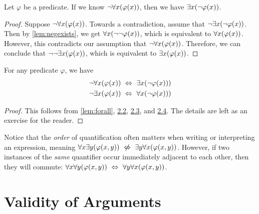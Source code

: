 \begin{lemma}\label{lem:negforall}
    Let $\varphi$ be a predicate.
    If we know $\neg \forall x \pn*{\varphi(x)}$, then we have $\exists x \pn*{\neg \varphi(x)}$.
\end{lemma}
\begin{proof}
    Suppose $\neg \forall x \pn*{\varphi(x)}$.
    Towards a contradiction, assume that $\neg \exists x \pn*{\neg \varphi(x)}$.
    Then by \autoref{lem:negexists}, we get $\forall x \pn*{\neg \neg \varphi(x)}$,
    which is equivalent to $\forall x \pn*{\varphi(x)}$.
    However, this contradicts our assumption that $\neg \forall x \pn*{\varphi(x)}$. \contradiction
    Therefore, we can conclude that $\neg \neg \exists x \pn*{\varphi(x)}$,
    which is equivalent to $\exists x \pn*{\varphi(x)}$.
\end{proof}

\begin{theorem}
    For any predicate $\varphi$, we have
    \begin{align*}
        \neg \forall x \pn*{\varphi(x)} &\iff \exists x \pn*{\neg \varphi(x))}\\
        \neg \exists x \pn*{\varphi(x)} &\iff \forall x \pn*{\neg \varphi(x))}
    \end{align*}
\end{theorem}
\begin{proof}
    This follows from \autoref{lem:forall}, \hyperref[lem:negexists]{2.2}, \hyperref[lem:exists]{2.3},
    and \hyperref[lem:negforall]{2.4}.
    The details are left as an exercise for the reader.
\end{proof}

\begin{remark}
    Notice that the \emph{order} of quantification often matters when writing or interpreting an expression,
    meaning $\forall x \exists y \pn*{\varphi(x, y)} \niff \exists y \forall x \pn*{\varphi(x, y)}$.
    However, if two instances of the \emph{same} quantifier occur immediately adjacent to each other,
    then they will commute: $\forall x \forall y \pn*{\varphi(x, y)} \iff \forall y \forall x \pn*{\varphi(x, y)}$.
\end{remark}

\newpage
\section{Validity of Arguments}

